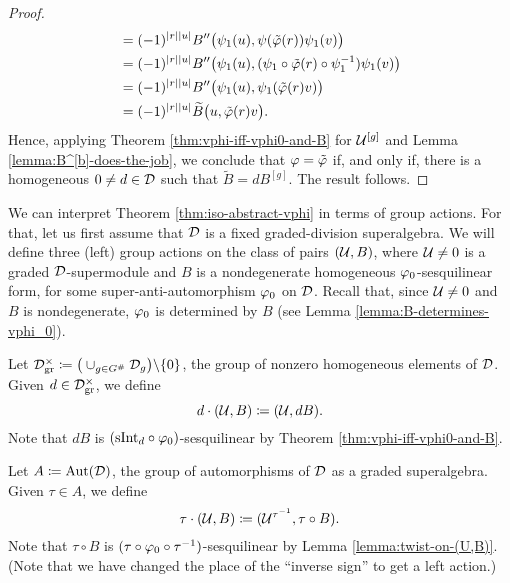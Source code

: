 \begin{proof}
\begin{align*}
        &= (-1)^{|r||u|} B'' \big( \psi_1(u), \psi (\tilde{\varphi}(r)) \psi_1(v) \big)\\
        &= (-1)^{|r||u|} B'' \big( \psi_1(u), (\psi_1 \circ \tilde{\varphi}(r) \circ \psi_1^{-1}) \psi_1(v) \big)\\
        &= (-1)^{|r||u|} B'' \big( \psi_1(u), \psi_1 (\tilde{\varphi}(r) v) \big)\\
        &= (-1)^{|r||u|} \widetilde B \big( u, \tilde{\varphi}(r) v\big).
    \end{align*}
    Hence, applying Theorem \ref{thm:vphi-iff-vphi0-and-B} for $\mathcal U^{[g]}$ and Lemma \ref{lemma:B^[b]-does-the-job}, we conclude that $\varphi = \tilde{\varphi}$ if, and only if, there is a homogeneous $0 \neq d \in \mathcal{D}$ such that $\widetilde B = dB^{[g]}$. 
    The result follows. 
\end{proof}

We can interpret Theorem \ref{thm:iso-abstract-vphi} in terms of group actions. 
For that, let us first assume that $\mathcal{D}$ is a fixed graded-division superalgebra. 
We will define three (left) group actions on the class of pairs $(\mathcal U, B)$, where $\mathcal U \neq 0$ is a graded $\mathcal{D}$-supermodule and $B$ is a nondegenerate homogeneous $\varphi_0$-sesquilinear form, for some super-anti-automorphism $\varphi_0$ on $\mathcal{D}$. 
Recall that, since $\mathcal U \neq 0$ and $B$ is nondegenerate, $\varphi_0$ is determined by $B$ (see Lemma \ref{lemma:B-determines-vphi_0}).

Let $\D^\times_{\mathrm{gr}} \coloneqq \big( \cup_{g \in G^\#} \D_g \big)\backslash \{ 0 \}$, the group of nonzero homogeneous elements of $\mathcal{D}$. 
Given $d\in \mathcal{D}^\times_{\mathrm{gr}}$, we define 
\begin{equation}\label{eq:Dx_gr-action}
    d\cdot (\mathcal U, B) \coloneqq (\mathcal U, dB).
\end{equation}
Note that $dB$ is $(\mathrm{sInt}_d \circ \varphi_0)$-sesquilinear by Theorem \ref{thm:vphi-iff-vphi0-and-B}.

Let $A \coloneqq \operatorname{Aut} (\mathcal{D})$, the group of automorphisms of $\mathcal{D}$ as a graded superalgebra. 
Given $\tau \in A$, we define
\begin{equation}\label{eq:Aut(D)-action}
    \tau \cdot (\mathcal U, B) \coloneqq (\mathcal U^{\tau^{-1}}, \tau \circ B).
\end{equation}
Note that $\tau \circ B$ is $(\tau \circ \varphi_0 \circ \tau^{-1})$-sesquilinear by Lemma \ref{lemma:twist-on-(U,B)}. (Note that we have changed the place of the ``inverse sign'' to get a left action.)

